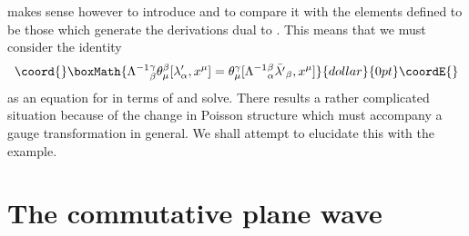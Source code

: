 \documentclass[12pt,a4paper]{article}
\def\ad{\mbox{ad}\,}
\providecommand{\initiate}{\setcounter{equation}{0}}
\begin{document}
makes sense however to introduce 
\myHighlight{$\bar{\lambda}^\prime_\alpha = \Lambda_\alpha^\beta \lambda_\beta$}\coordHE{} 
and to compare it with the elements \myHighlight{$\lambda^\prime_\beta$}\coordHE{} defined to
be those which generate the derivations dual to
\myHighlight{$\theta^{\prime\alpha}$}\coordHE{}.  This means that we must consider the
identity
$$\coord{}\boxMath{
\Lambda^{-1}{}^\gamma_\beta \theta^\beta_\mu
[\lambda^\prime_\alpha, x^\mu] = \theta^\gamma_\mu
[\Lambda^{-1}{}^\beta_\alpha \bar{\lambda^\prime}_\beta, x^\mu]
}{dollar}{0pt}\coordE{}$$
as an equation for \coordHE{} in terms of 
\myHighlight{$\bar {e}^\prime_\alpha = \ad \bar{\lambda}^\prime_\alpha$}\coordHE{} and solve. There
results a rather complicated situation because of the change in
Poisson structure which must accompany a gauge transformation in
general. We shall attempt to elucidate this with the example.


\initiate
\section{The commutative plane wave}\label{spp}
\end{document}
